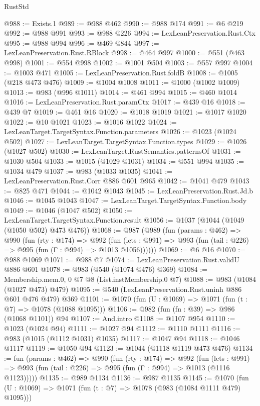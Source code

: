 \begin{lexlean}{RustStd}
\begin{coremodule}
@988 := Exists.{1}
@989 := @988 @462
@990 := @988 @174
@991 := @6 @219
@992 := @988 @991
@993 := @988 @226
@994 := LexLeanPreservation.Rust.Ctx
@995 := @988 @994
@996 := @469 @844
@997 := LexLeanPreservation.Rust.RBlock
@998 := @464 @997
@1000 := @551 (@463 @998)
@1001 := @554 @998
@1002 := @1001 @504
@1003 := @557 @997
@1004 := @1003 @471
@1005 := LexLeanPreservation.Rust.foldB
@1008 := @1005 (@218 @473 @476)
@1009 := @1004 @1008
@1011 := @1000 (@1002 @1009)
@1013 := @983 (@996 @1011)
@1014 := @461 @994
@1015 := @460 @1014
@1016 := LexLeanPreservation.Rust.paramCtx
@1017 := @439 @16
@1018 := @439 @7
@1019 := @461 @16
@1020 := @1018 @1019
@1021 := @1017 @1020
@1022 := @10 @1021
@1023 := @1016 @1022
@1024 := LexLeanTarget.TargetSyntax.Function.parameters
@1026 := @1023 (@1024 @502)
@1027 := LexLeanTarget.TargetSyntax.Function.types
@1029 := @1026 (@1027 @502)
@1030 := LexLeanTarget.RustSemantics.patternsOf
@1031 := @1030 @504
@1033 := @1015 (@1029 @1031)
@1034 := @551 @994
@1035 := @1034 @479
@1037 := @983 (@1033 @1035)
@1041 := LexLeanPreservation.Rust.Corr @886 @601 @965
@1042 := @1041 @479
@1043 := @825 @471
@1044 := @1042 @1043
@1045 := LexLeanPreservation.Rust.Jd.b
@1046 := @1045 @1043
@1047 := LexLeanTarget.TargetSyntax.Function.body
@1049 := @1046 (@1047 @502)
@1050 := LexLeanTarget.TargetSyntax.Function.result
@1056 := @1037 (@1044 (@1049 (@1050 @502) @473 @476))
@1068 := @987
    (@989
      (fun (params : @462) =>
      @990
        (fun (rty : @174) =>
        @992
          (fun (lets : @991) => @993 (fun (tail : @226) => @995 (fun (Γ : @994) => @1013 @1056))))))
@1069 := @6 @16
@1070 := @988 @1069
@1071 := @988 @7
@1074 := LexLeanPreservation.Rust.validU @886 @601
@1078 := @983 (@540 (@1074 @476) @369)
@1084 := Membership.mem.{0, 0} @7 @8 (List.instMembership.{0} @7)
@1088 := @983 (@1084 (@1027 @473) @479)
@1095 := @540 (LexLeanPreservation.Rust.uninh @886 @601 @476 @479) @369
@1101 := @1070 (fun (U : @1069) => @1071 (fun (t : @7) => @1078 (@1088 @1095)))
@1106 := @982 (fun (fn : @39) => @986 (@1068 @1101)) @94
@1107 := And.intro
@1108 := @1107 @954
@1110 := @1023 (@1024 @94)
@1111 := @1027 @94
@1112 := @1110 @1111
@1116 := @983 (@1015 (@1112 @1031) @1035)
@1117 := @1047 @94
@1118 := @1046 @1117
@1119 := @1050 @94
@1123 := @1044 (@1118 @1119 @473 @476)
@1134 := fun (params : @462) =>
  @990
    (fun (rty : @174) =>
    @992
      (fun (lets : @991) =>
      @993 (fun (tail : @226) => @995 (fun (Γ : @994) => @1013 (@1116 @1123)))))
@1135 := @989 @1134
@1136 := @987 @1135
@1145 := @1070 (fun (U : @1069) => @1071 (fun (t : @7) => @1078 (@983 (@1084 @1111 @479) @1095)))

\end{coremodule}
\end{lexlean}
